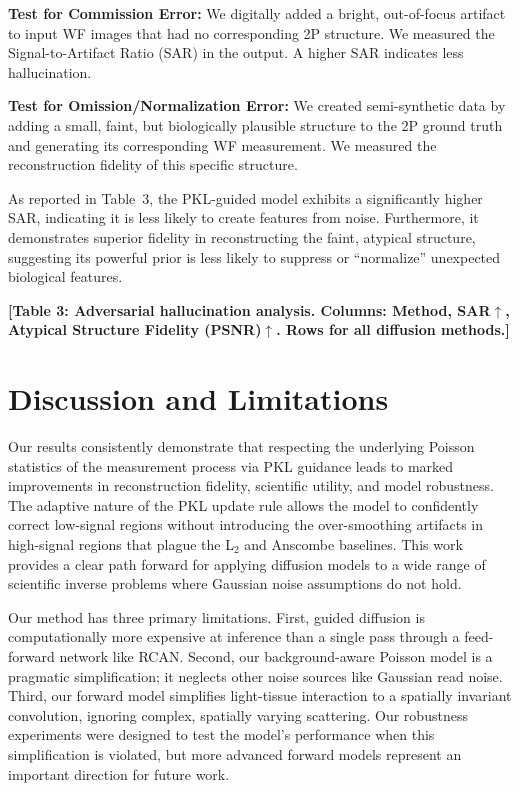 \documentclass{article}
\newcommand{\wf}{WF\xspace}
\newcommand{\twop}{2P\xspace}
\begin{document}
\textbf{Test for Commission Error:} We digitally added a bright, out-of-focus artifact to input \wf images that had no corresponding \twop structure. We measured the Signal-to-Artifact Ratio (SAR) in the output. A higher SAR indicates less hallucination.

\textbf{Test for Omission/Normalization Error:} We created semi-synthetic data by adding a small, faint, but biologically plausible structure to the \twop ground truth and generating its corresponding \wf measurement. We measured the reconstruction fidelity of this specific structure.

As reported in Table~3, the PKL-guided model exhibits a significantly higher SAR, indicating it is less likely to create features from noise. Furthermore, it demonstrates superior fidelity in reconstructing the faint, atypical structure, suggesting its powerful prior is less likely to suppress or ``normalize'' unexpected biological features.

\textbf{[Table 3: Adversarial hallucination analysis. Columns: Method, SAR$\uparrow$, Atypical Structure Fidelity (PSNR)$\uparrow$. Rows for all diffusion methods.]}


\section{Discussion and Limitations}
\label{sec:limitations}
Our results consistently demonstrate that respecting the underlying Poisson statistics of the measurement process via PKL guidance leads to marked improvements in reconstruction fidelity, scientific utility, and model robustness. The adaptive nature of the PKL update rule allows the model to confidently correct low-signal regions without introducing the over-smoothing artifacts in high-signal regions that plague the L$_2$ and Anscombe baselines. This work provides a clear path forward for applying diffusion models to a wide range of scientific inverse problems where Gaussian noise assumptions do not hold.

Our method has three primary limitations. First, guided diffusion is computationally more expensive at inference than a single pass through a feed-forward network like RCAN. Second, our background-aware Poisson model is a pragmatic simplification; it neglects other noise sources like Gaussian read noise. Third, our forward model simplifies light-tissue interaction to a spatially invariant convolution, ignoring complex, spatially varying scattering. Our robustness experiments were designed to test the model's performance when this simplification is violated, but more advanced forward models represent an important direction for future work.
\end{document}

